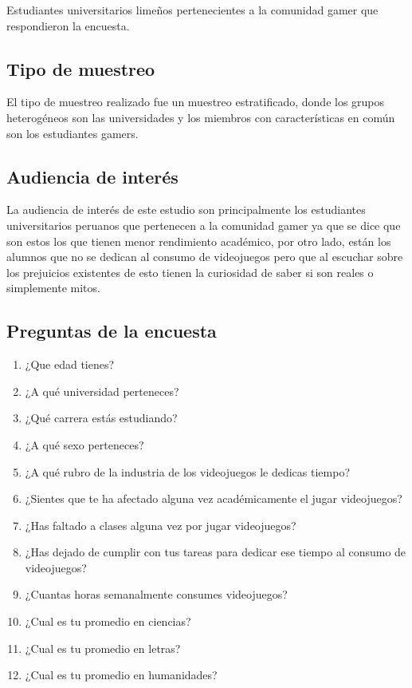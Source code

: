 \documentclass[]{article}
\providecommand{\tightlist}{%
  \setlength{\itemsep}{0pt}\setlength{\parskip}{0pt}}
\begin{document}
Estudiantes universitarios limeños pertenecientes a la comunidad gamer
que respondieron la encuesta.

\subsection{Tipo de muestreo}\label{tipo-de-muestreo}

El tipo de muestreo realizado fue un muestreo estratificado, donde los
grupos heterogéneos son las universidades y los miembros con
características en común son los estudiantes gamers.

\subsection{Audiencia de interés}\label{audiencia-de-interes}

La audiencia de interés de este estudio son principalmente los
estudiantes universitarios peruanos que pertenecen a la comunidad gamer
ya que se dice que son estos los que tienen menor rendimiento académico,
por otro lado, están los alumnos que no se dedican al consumo de
videojuegos pero que al escuchar sobre los prejuicios existentes de esto
tienen la curiosidad de saber si son reales o simplemente mitos.

\subsection{Preguntas de la encuesta}\label{preguntas-de-la-encuesta}

\begin{enumerate}
\def\labelenumi{\arabic{enumi}.}
\tightlist
\item
  ¿Que edad tienes?
\item
  ¿A qué universidad perteneces?
\item
  ¿Qué carrera estás estudiando?
\item
  ¿A qué sexo perteneces?
\item
  ¿A qué rubro de la industria de los videojuegos le dedicas tiempo?
\item
  ¿Sientes que te ha afectado alguna vez académicamente el jugar
  videojuegos?
\item
  ¿Has faltado a clases alguna vez por jugar videojuegos?
\item
  ¿Has dejado de cumplir con tus tareas para dedicar ese tiempo al
  consumo de videojuegos?
\item
  ¿Cuantas horas semanalmente consumes videojuegos?
\item
  ¿Cual es tu promedio en ciencias?
\item
  ¿Cual es tu promedio en letras?
\item
  ¿Cual es tu promedio en humanidades?
\end{enumerate}
\end{document}
